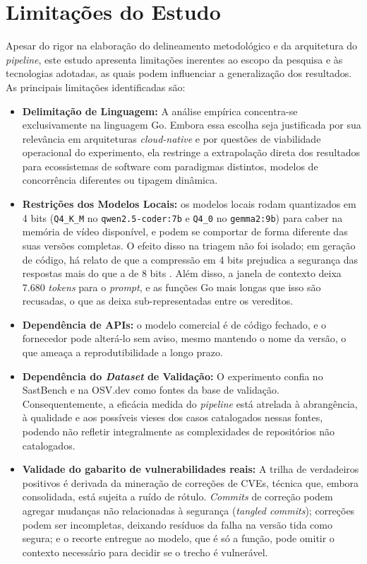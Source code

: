 \section{Limitações do Estudo}
\label{sec:limitacoes}
Apesar do rigor na elaboração do delineamento metodológico e da arquitetura do \textit{pipeline}, este estudo apresenta limitações inerentes ao escopo da pesquisa e às tecnologias adotadas, as quais podem influenciar a generalização dos resultados. As principais limitações identificadas são:
\begin{itemize}
\item \textbf{Delimitação de Linguagem:} A análise empírica concentra-se exclusivamente na linguagem Go. Embora essa escolha seja justificada por sua relevância em arquiteturas \textit{cloud-native} e por questões de viabilidade operacional do experimento, ela restringe a extrapolação direta dos resultados para ecossistemas de software com paradigmas distintos, modelos de concorrência diferentes ou tipagem dinâmica.
\item \textbf{Restrições dos Modelos Locais:} os modelos locais rodam quantizados em 4 bits (\texttt{Q4\_K\_M} no \texttt{qwen2.5-coder:7b} e \texttt{Q4\_0} no \texttt{gemma2:9b}) para caber na memória de vídeo disponível, e podem se comportar de forma diferente das suas versões completas. O efeito disso na triagem não foi isolado; em geração de código, há relato de que a compressão em 4 bits prejudica a segurança das respostas mais do que a de 8 bits \cite{haque2025quantized}. Além disso, a janela de contexto deixa 7.680 \textit{tokens} para o \textit{prompt}, e as funções Go mais longas que isso são recusadas, o que as deixa sub-representadas entre os vereditos.
\item \textbf{Dependência de APIs:} o modelo comercial é de código fechado, e o fornecedor pode alterá-lo sem aviso, mesmo mantendo o nome da versão, o que ameaça a reprodutibilidade a longo prazo.
\item \textbf{Dependência do \textit{Dataset} de Validação:} O experimento confia no SastBench e na OSV.dev como fontes da base de validação. Consequentemente, a eficácia medida do \textit{pipeline} está atrelada à abrangência, à qualidade e aos possíveis vieses dos casos catalogados nessas fontes, podendo não refletir integralmente as complexidades de repositórios não catalogados.
\item \textbf{Validade do gabarito de vulnerabilidades reais:} A trilha de verdadeiros positivos é derivada da mineração de correções de CVEs, técnica que, embora consolidada, está sujeita a ruído de rótulo. \textit{Commits} de correção podem agregar mudanças não relacionadas à segurança (\textit{tangled commits}); correções podem ser incompletas, deixando resíduos da falha na versão tida como segura; e o recorte entregue ao modelo, que é só a função, pode omitir o contexto necessário para decidir se o trecho é vulnerável.

\end{itemize}
